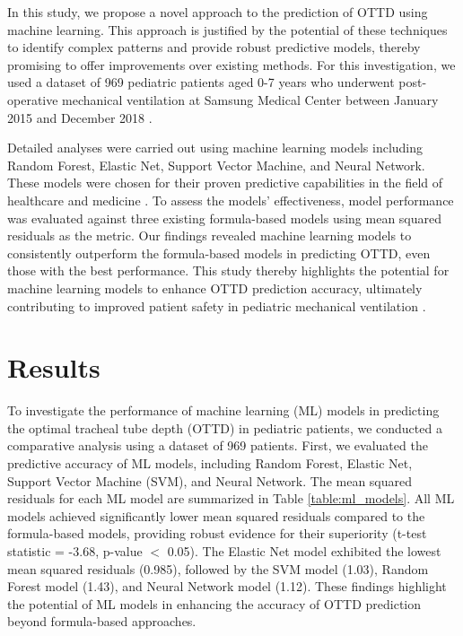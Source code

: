\documentclass[11pt]{article}
\begin{document}
In this study, we propose a novel approach to the prediction of OTTD using machine learning. This approach is justified by the potential of these techniques to identify complex patterns and provide robust predictive models, thereby promising to offer improvements over existing methods. For this investigation, we used a dataset of 969 pediatric patients aged 0-7 years who underwent post-operative mechanical ventilation at Samsung Medical Center between January 2015 and December 2018 \cite{Ingelse2017EarlyFO, Choi2022PredictionMF}.

Detailed analyses were carried out using machine learning models including Random Forest, Elastic Net, Support Vector Machine, and Neural Network. These models were chosen for their proven predictive capabilities in the field of healthcare and medicine \cite{Rajula2020ComparisonOC}. To assess the models' effectiveness, model performance was evaluated against three existing formula-based models using mean squared residuals as the metric. Our findings revealed machine learning models to consistently outperform the formula-based models in predicting OTTD, even those with the best performance. This study thereby highlights the potential for machine learning models to enhance OTTD prediction accuracy, ultimately contributing to improved patient safety in pediatric mechanical ventilation \cite{Lee2009BedsidePO,Rajula2020ComparisonOC}.

\section*{Results}

To investigate the performance of machine learning (ML) models in predicting the optimal tracheal tube depth (OTTD) in pediatric patients, we conducted a comparative analysis using a dataset of 969 patients. First, we evaluated the predictive accuracy of ML models, including Random Forest, Elastic Net, Support Vector Machine (SVM), and Neural Network. The mean squared residuals for each ML model are summarized in Table \ref{table:ml_models}. All ML models achieved significantly lower mean squared residuals compared to the formula-based models, providing robust evidence for their superiority (t-test statistic = -3.68, p-value $<$ 0.05). The Elastic Net model exhibited the lowest mean squared residuals (0.985), followed by the SVM model (1.03), Random Forest model (1.43), and Neural Network model (1.12). These findings highlight the potential of ML models in enhancing the accuracy of OTTD prediction beyond formula-based approaches.
\end{document}
